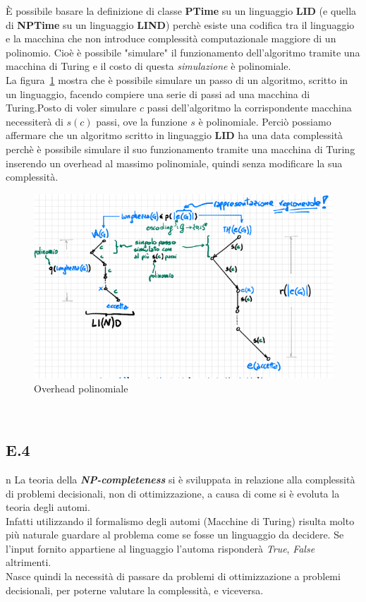 \documentclass[a4paper]{article}
\newcommand{\imp}[1]{\textbf{\textit{#1}}}
\begin{document}
È possibile basare la definizione di classe \textbf{PTime} su un linguaggio \textbf{LID} (e quella di \textbf{NPTime} su un linguaggio \textbf{LIND}) perchè esiste una codifica tra il linguaggio e la macchina che non introduce complessità computazionale maggiore di un polinomio.
Cioè è possibile "simulare" il funzionamento dell'algoritmo tramite una macchina di Turing e il costo di questa \textit{simulazione} è polinomiale.\\
La figura~\ref{FIG:E3} mostra che è possibile simulare un passo di un algoritmo, scritto in un linguaggio, facendo compiere una serie di passi ad una macchina di Turing.Posto di voler simulare $c$ passi dell'algoritmo la corrispondente macchina necessiterà di $s(c)$ passi, ove la funzione $s$ è polinomiale.
Perciò possiamo affermare che un algoritmo scritto in linguaggio \textbf{LID} ha una data complessità perchè è possibile simulare il suo funzionamento tramite una macchina di Turing inserendo un overhead al massimo polinomiale, quindi senza modificare la sua complessità.
\begin{figure}[!ht]
\centering
\includegraphics[width = 1\textwidth]{./img/E3.png}
\caption{Overhead polinomiale} \label{FIG:E3}
\end{figure}\\

\subsection{E.4}
n
La teoria della \imp{NP-completeness} si è sviluppata in relazione alla complessità di problemi decisionali, non di ottimizzazione, a causa di come si è evoluta la teoria degli automi.\\
Infatti utilizzando il formalismo degli automi (Macchine di Turing) risulta molto più naturale guardare al problema come se fosse un linguaggio da decidere. Se l'input fornito appartiene al linguaggio l'automa risponderà \textit{True}, \textit{False} altrimenti.\\
Nasce quindi la necessità di passare da problemi di ottimizzazione a problemi decisionali, per poterne valutare la complessità, e viceversa.
\end{document}
